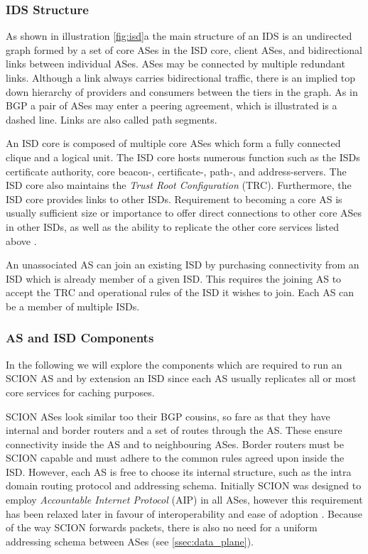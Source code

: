 \documentclass[../eva1_scion.tex]{subfiles}
\begin{document}
    \subsubsection{IDS Structure} \label{sssec:isd_structure}
    As shown in illustration \ref{fig:isd}a the main structure of an IDS is an undirected graph formed by a set of core ASes in the ISD core, client ASes, and bidirectional links between individual ASes. ASes may be connected by multiple redundant links. Although a link always carries bidirectional traffic, there is an implied top down hierarchy of providers and consumers between the tiers in the graph. As in BGP a pair of ASes may enter a peering agreement, which is illustrated is a dashed line. Links are also called path segments.

    An ISD core is composed of multiple core ASes which form a fully connected clique and a logical unit. The ISD core hosts numerous function such as the ISDs certificate authority, core beacon-, certificate-, path-, and address-servers. The ISD core also maintains the \textit{Trust Root Configuration} (TRC). Furthermore, the ISD core  provides links to other ISDs.  Requirement to becoming a core AS is usually sufficient size or importance to offer direct connections to other core ASes in other ISDs, as well as the ability to replicate the other core services listed above \cite{scion_2011}.

    An unassociated AS can join an existing ISD by purchasing connectivity from an ISD which is already member of a given ISD. This requires the joining AS to accept the TRC and operational rules of the ISD it wishes to join. Each AS can be a member of multiple ISDs.

    \subsubsection{AS and ISD Components} \label{sssec:as_componants}

    In the following we will explore the components which are required to run an SCION AS and by extension an ISD since each AS usually replicates all or most core services for caching purposes.

    SCION ASes look similar too their BGP cousins, so fare as that they have internal and border routers and a set of routes through the AS. These ensure connectivity inside the AS and to neighbouring ASes. Border routers must be SCION capable and must adhere to the common rules agreed upon inside the ISD. However, each AS is free to choose its internal structure, such as the intra domain routing protocol and addressing schema. Initially SCION was designed to employ \textit{Accountable Internet Protocol} (AIP) \cite{scion_2011, aip_2008} in all ASes, however this requirement has been relaxed later in favour of interoperability and ease of adoption \cite{scion_2015}. Because of the way SCION forwards packets, there is also no need for a uniform addressing schema between ASes (see \ref{ssec:data_plane}).
\end{document}
